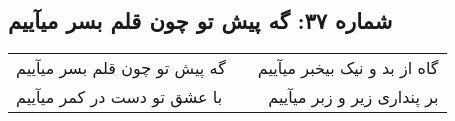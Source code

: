 \begin{center}
\section*{شماره ۳۷: گه پیش تو چون قلم بسر میآییم}
\label{sec:037}
\begin{longtable}{l p{0.5cm} r}
گه پیش تو چون قلم بسر میآییم
&&
گاه از بد و نیک بیخبر میآییم
\\
با عشق تو دست در کمر میآییم
&&
بر پنداری زیر و زبر میآییم
\\
\end{longtable}
\end{center}
